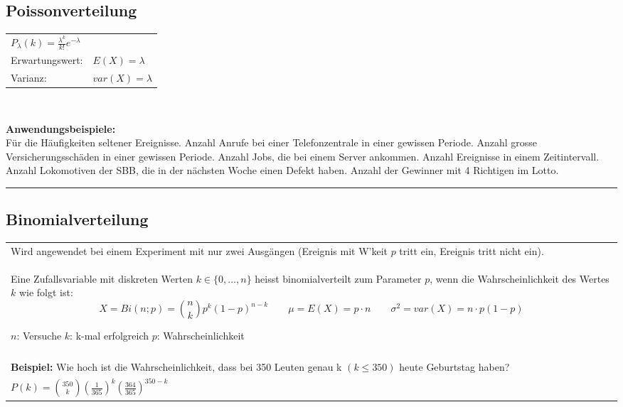 	\subsection{Poissonverteilung  }
	\begin{multicols}{3}
		\begin{tabular}{ll}
        $P_\lambda(k)=\frac{\lambda^k}{k!}e^{-\lambda}$ & \\
        Erwartungswert:  & $E(X)=\lambda$\\
        Varianz:  & $var(X)=\lambda$ \\
        \end{tabular} \\
        \columnbreak
        
        {\bf Anwendungsbeispiele:} \\ Für die Häufigkeiten seltener
        Ereignisse. Anzahl Anrufe bei einer Telefonzentrale in einer gewissen
        Periode. Anzahl grosse Versicherungsschäden in einer gewissen Periode.
        Anzahl Jobs, die bei einem Server ankommen. Anzahl Ereignisse in
        einem Zeitintervall. Anzahl Lokomotiven der SBB, die in der nächsten Woche 
        einen Defekt haben. Anzahl der Gewinner mit 4 Richtigen im Lotto.
     \end{multicols}
        

\hrule

		\subsection{Binomialverteilung  }
		\begin{tabular}{p{18cm}}
    	Wird angewendet bei einem Experiment mit nur zwei Ausgängen (Ereignis mit W'keit $p$ tritt
    	ein, Ereignis tritt nicht ein). \\
    	Eine Zufallsvariable mit diskreten Werten $k \in \{
    	0,\ldots,n \}$ heisst binomialverteilt zum Parameter $p$, wenn die
        Wahrscheinlichkeit des Wertes $k$ wie folgt ist:
		$$X = Bi(n; p) = \binom n k p^k(1-p)^{n-k} \qquad \mu = E(X) = p \cdot n \qquad \sigma^2 =
		var(X) = n \cdot p (1-p)$$
		
		$n$: Versuche \hspace{10mm}
		$k$: k-mal erfolgreich \hspace{10mm}
		$p$: Wahrscheinlichkeit\\\\
		
		{\bf Beispiel:} Wie hoch ist die Wahrscheinlichkeit, dass bei 350 Leuten genau
		k $(k\leq 350)$ heute Geburtstag haben?\\
		$P(k)=\binom {350} k \left(\frac{1}{365}\right)^k
		\left(\frac{364}{365}\right)^{350-k}$
		
        \end{tabular}


